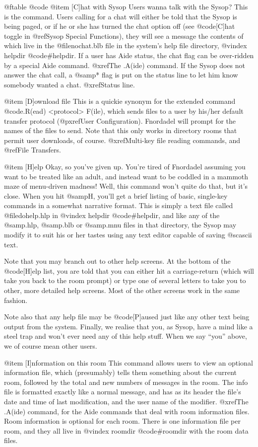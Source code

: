 @ftable @code
@item [C]hat with Sysop
Users wanna talk with the Sysop?  This is the command.
Users calling for a chat will either be told that the Sysop is
being paged, or if he or she has turned the chat option off
(see @code{[C]hat toggle} in @ref{Sysop Special Functions}),
they will see a message the contents of which live
in the @file{nochat.blb} file in the system's help file directory,
@vindex helpdir
@code{#helpdir}.  If a user has Aide status, the chat flag can be over-ridden
by a special Aide command.  @xref{The .A(ide) command}.
If the Sysop does not answer the chat call, a @samp{*} flag is put on
the status line to let him know somebody wanted a chat.  @xref{Status line}.

@item [D]ownload file
This is a quickie synonym for the extended command
@code{.R(ead) <protocol> F(ile)}, which sends files to a user by his/her
default transfer protocol (@pxref{User Configuration}).  Fnordadel will
prompt for the names of the files to send.  Note that this only works in
directory rooms that permit user downloads, of course.
@xref{Multi-key file reading commands}, and @ref{File Transfers}.

@item [H]elp
Okay, so you've given up.  You're tired of Fnordadel
assuming you want to be treated like an adult, and instead want to
be coddled in a mammoth maze of menu-driven madness!  Well, this command won't
quite do that, but it's close.  When you hit @samp{H}, you'll get a brief
listing of basic, single-key commands in a somewhat narrative
format.  This is simply a text file called @file{dohelp.hlp} in
@vindex helpdir
@code{#helpdir},
and like any of the @samp{.hlp}, @samp{.blb} or @samp{.mnu} files in that directory, the
Sysop may modify it to suit his or her tastes using any text editor
capable of saving @sc{ascii} text.

Note that you may branch out to other help screens.  At
the bottom of the @code{[H]elp} list, you are told that you can either hit
a carriage-return (which will take you back to the room prompt) or
type one of several letters to take you to other, more detailed help
screens.  Most of the other screens work in the same fashion.

Note also that any help file may be @code{[P]aused} just like any
other text being output from the system.  Finally, we realise that
you, as Sysop, have a mind like a steel trap and won't ever need
any of this help stuff.  When we say ``you'' above, we of course mean
other users.

@item [I]nformation on this room
This command allows users to view an optional information file,
which (presumably) tells them something about the current room, followed
by the total and new numbers of messages in the room.  The
info file is formatted exactly like a normal message, and has as its header
the file's date and time of last modification, and the user name of the
modifier.  @xref{The .A(ide) command}, for the Aide commands that deal with
room information files.  Room information is optional for each room.
There is one information file per room, and they all live in
@vindex roomdir
@code{#roomdir}
with the room data files.

